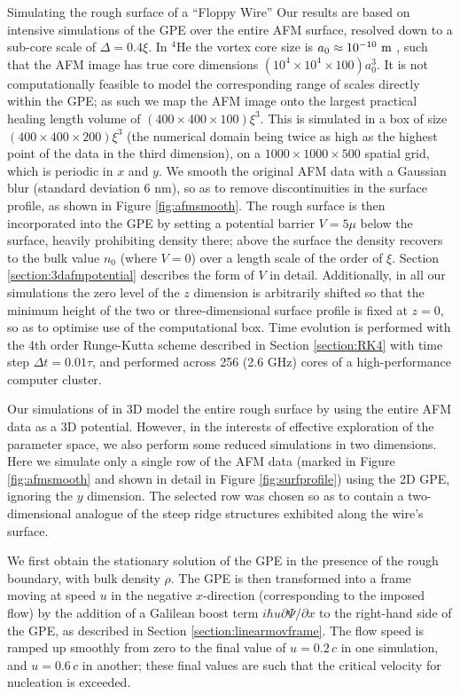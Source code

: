 \begin{chapter}{\label{cha:afm}Simulating the rough surface of a ``Floppy Wire''}
Our results are based on intensive simulations of the GPE over the entire AFM surface, resolved down to a sub-core scale of $\Delta=0.4\xi$. In $^4$He the vortex core size is $a_0 \approx 10^{-10}~\rm m$ \cite{Rayfield1964}, such that the AFM image has true core dimensions $(10^4 \times 10^4 \times 100) a_0^3$.  It is not computationally feasible to model the corresponding range of scales directly within the GPE; as such we map the AFM image onto the largest practical healing length volume of $(400 \times 400 \times 100) \xi^3$.  This is simulated in a box of size $(400 \times 400 \times 200) \xi^3$ (the numerical domain being twice as high as the highest point of the data in the third dimension), on a $1000\times 1000\times 500$ spatial grid, which is periodic in $x$ and $y$.  We smooth the original AFM data with a Gaussian blur (standard deviation 6 nm), so as to remove discontinuities in the surface profile, as shown in Figure \ref{fig:afmsmooth}. The rough surface is then incorporated into the GPE by setting a potential barrier $V=5\mu$ below the surface, heavily prohibiting density there; above the surface the density recovers to the bulk value $n_0$ (where $V=0$) over a length scale of the order of $\xi$. Section \ref{section:3dafmpotential} describes the form of $V$ in detail. Additionally, in all our simulations the zero level of the $z$ dimension is arbitrarily shifted so that the minimum height of the two or three-dimensional surface profile is fixed at $z=0$, so as to optimise use of the computational box. Time evolution is performed with the 4th order Runge-Kutta scheme described in Section \ref{section:RK4} with time step $\Delta t=0.01 \tau $, and performed across 256 (2.6 GHz) cores of a high-performance {computer} cluster.

Our simulations of in 3D model the entire rough surface by using the entire AFM data as a 3D potential. However, in the interests of effective exploration of the parameter space, we also perform some reduced simulations in two dimensions. Here we simulate only a single row of the AFM data (marked in Figure \ref{fig:afmsmooth} and shown in detail in Figure \ref{fig:surfprofile}) using the 2D GPE, ignoring the $y$ dimension. The selected row was chosen so as to contain a two-dimensional analogue of the steep ridge structures exhibited along the wire's surface.

We first obtain the stationary solution of the GPE in the presence of
the rough boundary, with bulk density $\rho$.  The GPE is then transformed into a frame moving at speed $u$ in the negative $x$-direction (corresponding to the imposed flow) by the addition of a Galilean boost term $ i \hbar u \partial \Psi/\partial x$ to the right-hand side of the GPE, as described in Section \ref{section:linearmovframe}.  The flow speed is ramped up smoothly from zero to the final value of $u=0.2\,c$ in one simulation, and $u=0.6\,c$ in another; these final values are such that the critical velocity for nucleation is exceeded. 


\end{chapter}
